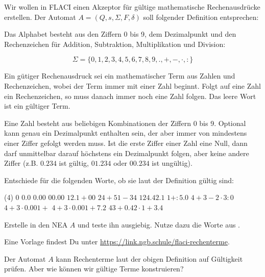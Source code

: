 \documentclass[fontsize=10pt, a4paper, ngerman]{scrartcl}
\begin{document}
\ReiheTitel

Wir wollen in FLACI einen Akzeptor für gültige mathematische Rechenausdrücke erstellen.
Der Automat $A = (Q, s, \Sigma, F, \delta)$ soll folgender Definition entsprechen:


\begin{rahmen}\small
	Das Alphabet besteht aus den Ziffern 0 bis 9, dem Dezimalpunkt und den Rechenzeichen
	für Addition, Subtraktion, Multiplikation und Division:

	\[ \Sigma = \{0,1,2,3,4,5,6,7,8,9,.,+,-,\cdot,:\} \]

	Ein gütiger Rechenausdruck sei ein mathematischer Term aus Zahlen und Rechenzeichen,
	wobei der Term immer mit einer Zahl beginnt. Folgt auf eine Zahl ein Rechenzeichen,
	so muss danach immer noch eine Zahl folgen. Das leere Wort ist ein gültiger Term.

	Eine Zahl besteht aus beliebigen Kombinationen der Ziffern 0 bis 9. Optional kann
	genau ein Dezimalpunkt enthalten sein, der aber immer von mindestens einer Ziffer
	gefolgt werden muss. Ist die erste Ziffer einer Zahl eine Null, dann darf unmittelbar
	darauf höchstens ein Dezimalpunkt folgen, aber keine andere Ziffer (z.B. $0.234$ ist
	gültig, $01.234$ oder $00.234$ ist ungültig).
\end{rahmen}

\begin{aufgabe}\label{aufg:worte}
	Entschiede für die folgenden Worte, ob sie laut der Definition gültig sind:

	\begin{tasks}(4)
		\task $0$
		\task $0.0$
		\task $0.00$
		\task $00.00$
		\task $12.1+00$
		\task $24+51-34$
		\task $124.42.1$
		\task $1+:5.0$
		\task $4+3-2\cdot3:0$
		\task $4+3\cdot0.001+$
		\task $4+3\cdot0.001+7.2$
		\task $43+0.42\cdot1+3.4$
	\end{tasks}
\end{aufgabe}

\begin{aufgabe}
	Erstelle in  den NEA $A$ und teste ihn ausgiebig. Nutze dazu die
	Worte aus .

	Eine Vorlage findest Du unter \url{https://link.ngb.schule/flaci-rechenterme}.
\end{aufgabe}

\linie[\textwidth]

Der Automat $A$ kann Rechenterme laut der obigen Definition auf Gültigkeit prüfen.
Aber wie können wir gültige Terme konstruieren?
\end{document}
